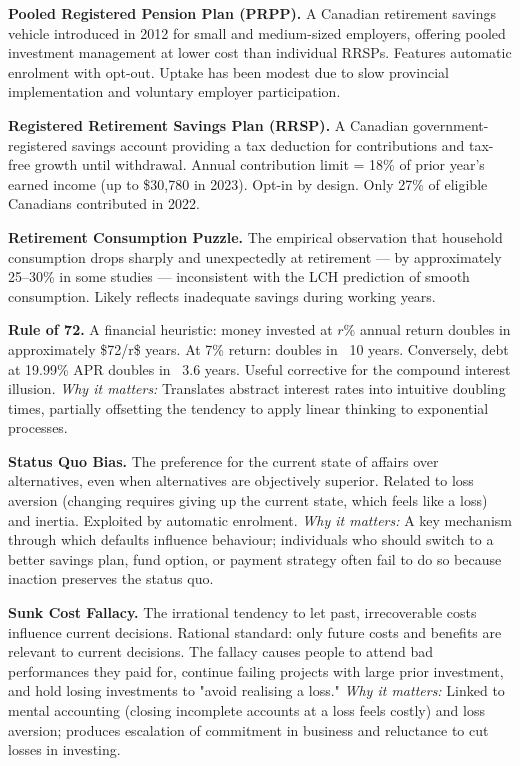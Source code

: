 \documentclass[12pt, letterpaper]{article}
\begin{document}
\textbf{Pooled Registered Pension Plan (PRPP).} A Canadian retirement savings vehicle introduced in 2012 for small and medium-sized employers, offering pooled investment management at lower cost than individual RRSPs. Features automatic enrolment with opt-out. Uptake has been modest due to slow provincial implementation and voluntary employer participation.

\textbf{Registered Retirement Savings Plan (RRSP).} A Canadian government-registered savings account providing a tax deduction for contributions and tax-free growth until withdrawal. Annual contribution limit = 18\% of prior year's earned income (up to \$30,780 in 2023). Opt-in by design. Only 27\% of eligible Canadians contributed in 2022.

\textbf{Retirement Consumption Puzzle.} The empirical observation that household consumption drops sharply and unexpectedly at retirement --- by approximately 25--30\% in some studies --- inconsistent with the LCH prediction of smooth consumption. Likely reflects inadequate savings during working years.

\textbf{Rule of 72.} A financial heuristic: money invested at $r$\% annual return doubles in approximately \$72/r\$ years. At 7\% return: doubles in ~10 years. Conversely, debt at 19.99\% APR doubles in ~3.6 years. Useful corrective for the compound interest illusion. \textit{Why it matters:} Translates abstract interest rates into intuitive doubling times, partially offsetting the tendency to apply linear thinking to exponential processes.

\textbf{Status Quo Bias.} The preference for the current state of affairs over alternatives, even when alternatives are objectively superior. Related to loss aversion (changing requires giving up the current state, which feels like a loss) and inertia. Exploited by automatic enrolment. \textit{Why it matters:} A key mechanism through which defaults influence behaviour; individuals who should switch to a better savings plan, fund option, or payment strategy often fail to do so because inaction preserves the status quo.

\textbf{Sunk Cost Fallacy.} The irrational tendency to let past, irrecoverable costs influence current decisions. Rational standard: only future costs and benefits are relevant to current decisions. The fallacy causes people to attend bad performances they paid for, continue failing projects with large prior investment, and hold losing investments to "avoid realising a loss." \textit{Why it matters:} Linked to mental accounting (closing incomplete accounts at a loss feels costly) and loss aversion; produces escalation of commitment in business and reluctance to cut losses in investing.
\end{document}
